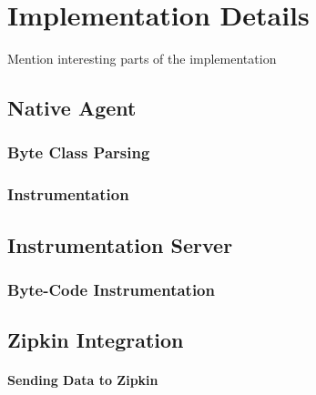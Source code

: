 \chapter{Implementation Details}
Mention interesting parts of the implementation
\section{Native Agent}
\subsection{Byte Class Parsing}
\subsection{Instrumentation}
\section{Instrumentation Server}
\subsection{Byte-Code Instrumentation}
\section{Zipkin Integration}
\subsubsection{Sending Data to Zipkin}
